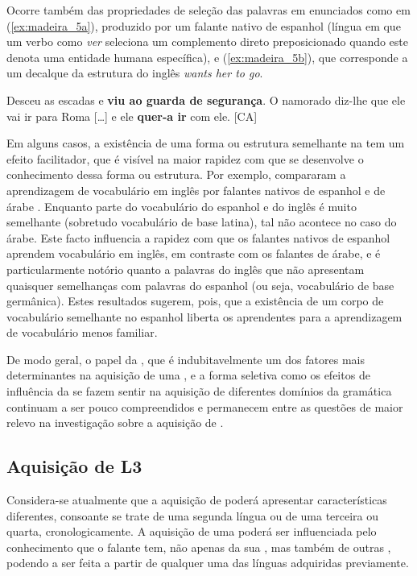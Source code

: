 \documentclass[output=paper]{LSP/langsci}
\begin{document}
Ocorre também  das propriedades de seleção das palavras em enunciados como em (\ref{ex:madeira_5a}), produzido por um falante nativo de espanhol (língua em que um verbo como \textit{ver} seleciona um complemento direto preposicionado quando este denota uma entidade humana específica), e (\ref{ex:madeira_5b}), que corresponde a um decalque da estrutura do inglês \textit{wants her to go}.

\ea\label{ex:madeira_5}
\ea\label{ex:madeira_5a} Desceu as escadas e \textbf{viu ao guarda de segurança}.
\ex\label{ex:madeira_5b} O namorado diz-lhe que ele vai ir para Roma [\ldots] e ele \textbf{quer-a ir} com ele. [CA]
\zl

Em alguns casos, a existência de uma forma ou estrutura semelhante na  tem um efeito facilitador, que é visível na maior rapidez com que se desenvolve o conhecimento dessa forma ou estrutura. Por exemplo, \citet{ardhomburg1983} compararam a aprendizagem de vocabulário em inglês  por falantes nativos de espanhol e de árabe . Enquanto parte do vocabulário do espanhol e do inglês é muito semelhante (sobretudo vocabulário de base latina), tal não acontece no caso do árabe. Este facto influencia a rapidez com que os falantes nativos de espanhol aprendem vocabulário em inglês, em contraste com os falantes de árabe, e é particularmente notório quanto a palavras do inglês que não apresentam quaisquer semelhanças com palavras do espanhol (ou seja, vocabulário de base germânica). Estes resultados sugerem, pois, que a existência de um corpo de vocabulário semelhante no espanhol  liberta os aprendentes para a aprendizagem de vocabulário menos familiar. 

De modo geral, o papel da , que é indubitavelmente um dos fatores mais determinantes na aquisição de uma , e a forma seletiva como os efeitos de influência da  se fazem sentir na aquisição de diferentes domínios da gramática continuam a ser pouco compreendidos e permanecem entre as questões de maior relevo na investigação sobre a aquisição de .

\subsection{Aquisição de L3}
\label{subsec:madeira_aquisicao_l3}
Considera-se atualmente que a aquisição de  poderá apresentar características diferentes, consoante se trate de uma segunda língua ou de uma terceira ou quarta, cronologicamente. A aquisição de uma  poderá ser influenciada pelo conhecimento que o falante tem, não apenas da sua , mas também de outras , podendo a  ser feita a partir de qualquer uma das línguas adquiridas previamente.
\end{document}
